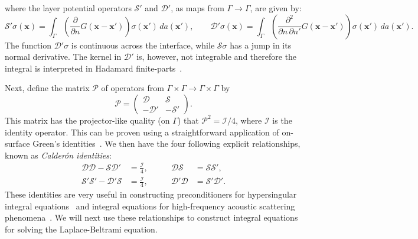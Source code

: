 \documentclass[11pt]{article}
\newcommand{\bx}{\bm x}
\newcommand{\cI}{\mathcal I}
\newcommand{\cP}{\mathcal P}
\newcommand{\cS}{\mathcal S}
\newcommand{\cD}{\mathcal D}
\numberwithin{equation}{section}
\begin{document}
where the layer potential operators $\cS'$ and $\cD'$, as maps from
$\Gamma \to \Gamma$, are given by:
\begin{equation}
\cS'\sigma(\bx) = \int_\Gamma \left( \frac{\partial }{\partial n}
G(\bx-\bx') \right)  \sigma(\bx')
\, da(\bx'), 
\qquad  \cD'\sigma(\bx) = \int_\Gamma \left( \frac{\partial^2 }
  {\partial n \, \partial n'}
G(\bx-\bx') \right)  \sigma(\bx') \, da(\bx').
\end{equation}
The function $\cD'\sigma$ is continuous across the interface, while
$\cS\sigma$ has a jump in its normal derivative.
The kernel in $\cD'$ is, however, not
integrable and therefore the integral is interpreted in Hadamard
finite-parts~\cite{nedelec,kress_2014,colton_kress}.

Next, define the matrix $\cP$ of operators from $\Gamma \times \Gamma
\to \Gamma \times \Gamma$ by
\begin{equation}
\cP = \begin{pmatrix}
\cD & \cS \\
-\cD' & -\cS'
\end{pmatrix}.
\end{equation}
This matrix has the projector-like quality (on $\Gamma$) that
$\cP^2 = \cI/4$, where $\cI$ is the identity operator. This
can be proven using a straightforward application
of on-surface Green's identities~\cite{nedelec}.
We then have the four following explicit relationships, known as
\emph{Calder\'on identities}:
\begin{equation}\label{eq_cal}
\begin{aligned}
  \cD \cD - \cS \cD' &= \frac{\cI}{4}, \qquad & \cD \cS &= \cS \cS', \\
\cS' \cS' - \cD' \cS &= 
\frac{\cI}{4},  & \cD' \cD &= \cS' \cD'.
\end{aligned}
\end{equation}
These identities are very useful in constructing preconditioners for
hypersingular integral equations~\cite{contopanagos-2002} and integral
equations for high-frequency acoustic scattering
phenomena~\cite{boubendir-2014}. We will next use these relationships to
construct integral equations for solving the Laplace-Beltrami equation.
\end{document}
